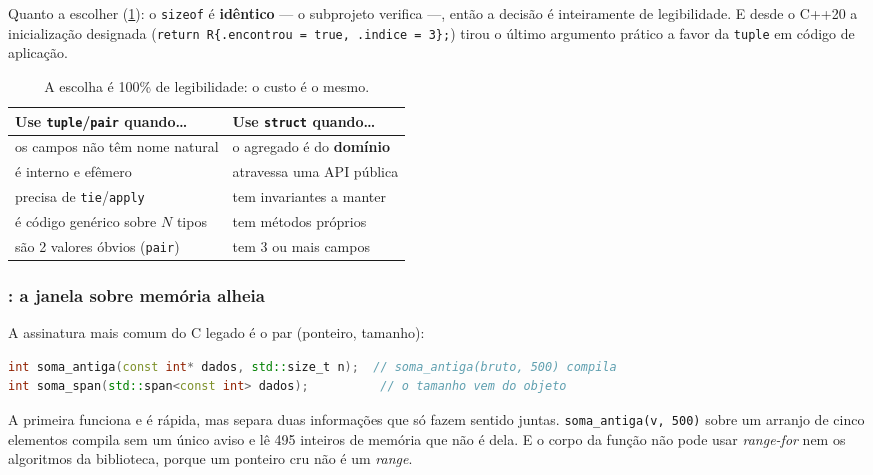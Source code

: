 Quanto a escolher (\cref{tab:tuple-ou-struct}): o \texttt{sizeof} é
\textbf{idêntico} --- o subprojeto verifica ---, então a decisão é inteiramente
de legibilidade. E desde o C++20 a inicialização designada
(\texttt{return R\{.encontrou = true, .indice = 3\};}) tirou o último argumento
prático a favor da \texttt{tuple} em código de aplicação.

\begin{table}[htbp]
\centering
\caption{A escolha é 100\% de legibilidade: o custo é o mesmo.}
\label{tab:tuple-ou-struct}
\footnotesize
\begin{tabular}{@{}ll@{}}
\toprule
\textbf{Use \texttt{tuple}/\texttt{pair} quando\ldots} & \textbf{Use \texttt{struct} quando\ldots} \\
\midrule
os campos não têm nome natural         & o agregado é do \textbf{domínio} \\
é interno e efêmero                    & atravessa uma API pública \\
precisa de \texttt{tie}/\texttt{apply} & tem invariantes a manter \\
é código genérico sobre $N$ tipos      & tem métodos próprios \\
são 2 valores óbvios (\texttt{pair})   & tem 3 ou mais campos \\
\bottomrule
\end{tabular}
\end{table}

\subsubsection{: a janela sobre memória alheia}

A assinatura mais comum do C legado é o par (ponteiro, tamanho):

\begin{lstlisting}[style=bt, language=C++,
    caption={O parâmetro que não pode discordar de si mesmo, em
             \texttt{src/vocabulary\_types/demo\_span.hpp}.}]
int soma_antiga(const int* dados, std::size_t n);  // soma_antiga(bruto, 500) compila
int soma_span(std::span<const int> dados);          // o tamanho vem do objeto
\end{lstlisting}

A primeira funciona e é rápida, mas separa duas informações que só fazem sentido
juntas. \texttt{soma\_antiga(v, 500)} sobre um arranjo de cinco elementos
compila sem um único aviso e lê 495 inteiros de memória que não é dela. E o
corpo da função não pode usar \emph{range-for} nem os algoritmos da biblioteca,
porque um ponteiro cru não é um \emph{range}.


